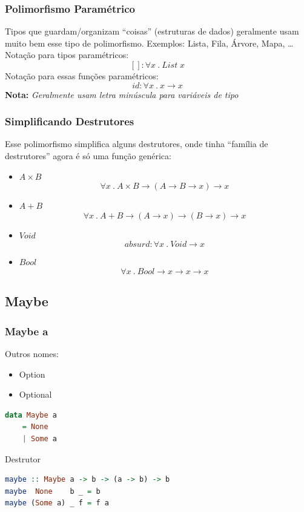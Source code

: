 \documentclass{beamer}
\newcommand{\nota}[1]{\textbf{Nota:}\textit{ #1}}
\renewcommand{\d}{\:.\:}
\begin{document}
\begin{frame}
    \frametitle{Polimorfismo Paramétrico}
    Tipos  que guardam/organizam ``coisas''
    (estruturas de dados) geralmente usam
    muito bem esse tipo de polimorfismo.
    Exemplos: Lista, Fila, Árvore, Mapa, \dots
    \vfill
    Notação para tipos paramétricos:
    \[
        [] : \forall x \d List \; x
    \]
    \vfill
    Notação para essas funções paramétricos:
    \[
        id : \forall x \d x \to x
    \]
    \vfill
    \nota{Geralmente usam letra minúscula para variáveis de tipo}
\end{frame}

\begin{frame}
    \frametitle{Simplificando Destrutores}
    Esse polimorfismo simplifica alguns destrutores,
    onde tinha ``família de destrutores''
    agora é só uma função genérica:
    \begin{itemize}
        \item \(A \times B\)
            \[
                \forall x \d A \times B \to (A \to B \to x) \to x
            \]
        \item \(A + B\)
            \[
                \forall x \d A + B \to (A \to x) \to (B \to x) \to x
            \]
        \item \(Void\)
            \[
                absurd: \forall x \d Void \to x
            \]
        \item \(Bool\)
            \[
                \forall x \d Bool \to x \to x \to x
            \]
    \end{itemize}
\end{frame}

\subsection{Maybe}
\begin{frame}[fragile]
    \frametitle{Maybe a}
    Outros nomes:
    \begin{itemize}
        \item Option
        \item Optional
    \end{itemize}
    \vfill
    \begin{lstlisting}[language=Haskell]
data Maybe a
    = None
    | Some a
    \end{lstlisting}
    \vfill
    Destrutor
    \begin{lstlisting}[language=Haskell]
maybe :: Maybe a -> b -> (a -> b) -> b
maybe  None    b _ = b
maybe (Some a) _ f = f a
    \end{lstlisting}
\end{frame}
\end{document}

